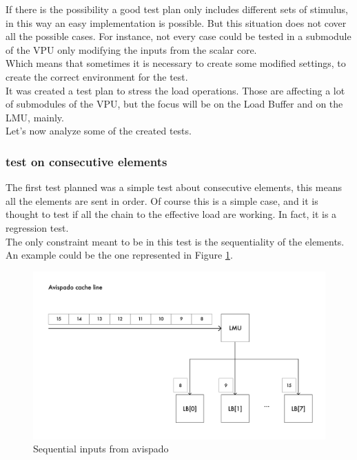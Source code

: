 If there is the possibility a good test plan only includes different sets of stimulus, in this way an easy implementation is possible. But this situation does not cover all the possible cases. For instance, not every case could be tested in a submodule of the VPU only modifying the inputs from the scalar core.\\
Which means that sometimes it is necessary to create some modified settings, to create the correct environment for the test.\\

It was created a test plan to stress the load operations. Those are affecting a lot of submodules of the VPU, but the focus will be on the Load Buffer and on the LMU, mainly.\\
Let's now analyze some of the created tests.

\subsubsection{test on consecutive elements}
The first test planned was a simple test about consecutive elements, this means all the elements are sent in order. Of course this is a simple case, and it is thought to test if all the chain to the effective load are working. In fact, it is a regression test.\\

The only constraint meant to be in this test is the sequentiality of the elements.\\
An example could be the one represented in Figure \ref{cache-to-lb-seq-ex}.


\begin{figure}[H]
    \centering
    \includegraphics[scale = 0.6]{Chapter_2/img/cache-to-lb-seq-ex.png}
    \caption{Sequential inputs from avispado}
    \label{cache-to-lb-seq-ex}
\end{figure}

